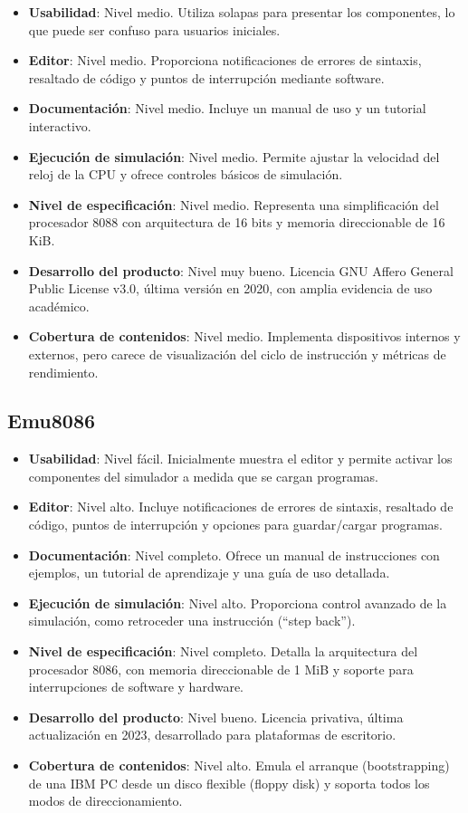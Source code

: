 \documentclass[12pt,oneside]{templates/unerthesis}
\providecommand{\tightlist}{%
  \setlength{\itemsep}{0pt}\setlength{\parskip}{0pt}}
\begin{document}
\begin{itemize}
\tightlist
\item
  \textbf{Usabilidad}: Nivel medio. Utiliza solapas para presentar los componentes, lo que puede ser confuso para usuarios iniciales.
\item
  \textbf{Editor}: Nivel medio. Proporciona notificaciones de errores de sintaxis, resaltado de código y puntos de interrupción mediante software.
\item
  \textbf{Documentación}: Nivel medio. Incluye un manual de uso y un tutorial interactivo.
\item
  \textbf{Ejecución de simulación}: Nivel medio. Permite ajustar la velocidad del reloj de la CPU y ofrece controles básicos de simulación.
\item
  \textbf{Nivel de especificación}: Nivel medio. Representa una simplificación del procesador 8088 con arquitectura de 16 bits y memoria direccionable de 16 KiB.
\item
  \textbf{Desarrollo del producto}: Nivel muy bueno. Licencia GNU Affero General Public License v3.0, última versión en 2020, con amplia evidencia de uso académico.
\item
  \textbf{Cobertura de contenidos}: Nivel medio. Implementa dispositivos internos y externos, pero carece de visualización del ciclo de instrucción y métricas de rendimiento.
\end{itemize}

\hypertarget{emu8086}{%
\subsection{Emu8086}\label{emu8086}}

\begin{itemize}
\tightlist
\item
  \textbf{Usabilidad}: Nivel fácil. Inicialmente muestra el editor y permite activar los componentes del simulador a medida que se cargan programas.
\item
  \textbf{Editor}: Nivel alto. Incluye notificaciones de errores de sintaxis, resaltado de código, puntos de interrupción y opciones para guardar/cargar programas.
\item
  \textbf{Documentación}: Nivel completo. Ofrece un manual de instrucciones con ejemplos, un tutorial de aprendizaje y una guía de uso detallada.
\item
  \textbf{Ejecución de simulación}: Nivel alto. Proporciona control avanzado de la simulación, como retroceder una instrucción (``step back'').
\item
  \textbf{Nivel de especificación}: Nivel completo. Detalla la arquitectura del procesador 8086, con memoria direccionable de 1 MiB y soporte para interrupciones de software y hardware.
\item
  \textbf{Desarrollo del producto}: Nivel bueno. Licencia privativa, última actualización en 2023, desarrollado para plataformas de escritorio.
\item
  \textbf{Cobertura de contenidos}: Nivel alto. Emula el arranque (bootstrapping) de una IBM PC desde un disco flexible (floppy disk) y soporta todos los modos de direccionamiento.
\end{itemize}
\end{document}

